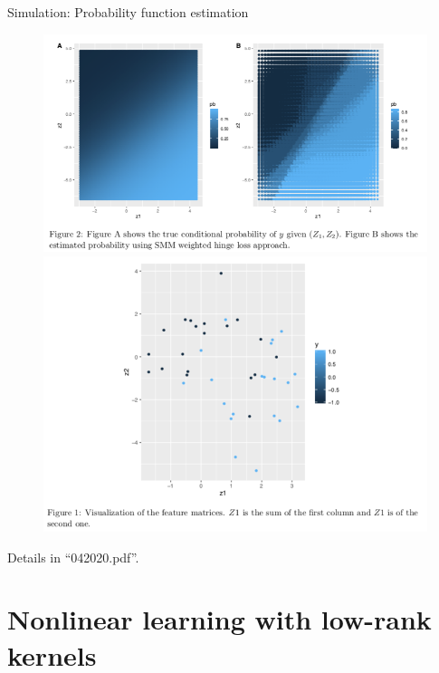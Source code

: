 \documentclass[compress,dvipsnames]{beamer}
\begin{document}
\begin{frame}{Simulation: Probability function estimation}
\begin{figure}[H]
\centering
\includegraphics[width=.6\textwidth]{Fig2}

\includegraphics[width=.4\textwidth]{Fig1}
\end{figure}
\vspace{-.5cm}
{\scriptsize Details in ``042020.pdf''.}
\end{frame}





\section{Nonlinear learning with low-rank kernels}
\end{document}
